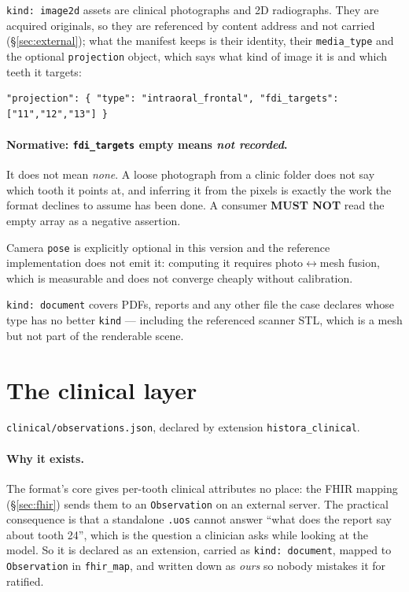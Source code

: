 \documentclass[11pt,a4paper]{article}
\newcommand{\MUSTNOT}{\textcolor{uosred}{\textbf{MUST NOT}}}
\newcommand{\code}[1]{\texttt{\small #1}}
\begin{document}
\code{kind: image2d} assets are clinical photographs and 2D radiographs. They are acquired
originals, so they are referenced by content address and not carried (\S\ref{sec:external});
what the manifest keeps is their identity, their \code{media\_type} and the optional
\code{projection} object, which says what kind of image it is and which teeth it targets:

\begin{lstlisting}[style=js]
"projection": { "type": "intraoral_frontal", "fdi_targets": ["11","12","13"] }
\end{lstlisting}

\paragraph{Normative: \code{fdi\_targets} empty means \emph{not recorded}.}
It does not mean \emph{none}. A loose photograph from a clinic folder does not say which
tooth it points at, and inferring it from the pixels is exactly the work the format
declines to assume has been done. A consumer \MUSTNOT{} read the empty array as a negative
assertion.

\vspace{6px}
Camera \code{pose} is explicitly optional in this version and the reference implementation does not
emit it: computing it requires photo$\leftrightarrow$mesh fusion, which is measurable and
does not converge cheaply without calibration.

\code{kind: document} covers PDFs, reports and any other file the case declares whose type
has no better \code{kind} --- including the referenced scanner STL, which is a mesh but not
part of the renderable scene.

\section{The clinical layer}\label{sec:clinical}

\code{clinical/observations.json}, declared by extension \code{histora\_clinical}.

\paragraph{Why it exists.} The format's core gives per-tooth clinical attributes no place: the FHIR
mapping (\S\ref{sec:fhir}) sends them to an \code{Observation} on an external server. The practical consequence is
that a standalone \code{.uos} cannot answer ``what does the report say about tooth 24'',
which is the question a clinician asks while looking at the model. So it is declared as an
extension, carried as \code{kind: document}, mapped to \code{Observation} in
\code{fhir\_map}, and written down as \emph{ours} so nobody mistakes it for ratified.
\end{document}
